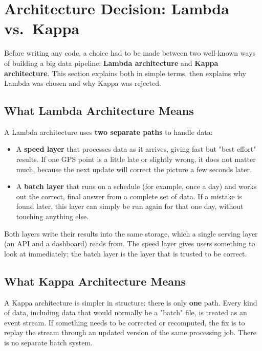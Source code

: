 \documentclass[12pt,a4paper]{article}
\begin{document}
\section{Architecture Decision: Lambda vs.\ Kappa}

Before writing any code, a choice had to be made between two well-known
ways of building a big data pipeline: \textbf{Lambda architecture} and
\textbf{Kappa architecture}. This section explains both in simple terms,
then explains why Lambda was chosen and why Kappa was rejected.

\subsection{What Lambda Architecture Means}

A Lambda architecture uses \textbf{two separate paths} to handle data:

\begin{itemize}
  \item A \textbf{speed layer} that processes data as it arrives, giving
    fast but "best effort" results. If one GPS point is a little late or
    slightly wrong, it does not matter much, because the next update will
    correct the picture a few seconds later.
  \item A \textbf{batch layer} that runs on a schedule (for example, once a
    day) and works out the correct, final answer from a complete set of
    data. If a mistake is found later, this layer can simply be run again
    for that one day, without touching anything else.
\end{itemize}

Both layers write their results into the same storage, which a single
serving layer (an API and a dashboard) reads from. The speed layer gives
users something to look at immediately; the batch layer is the layer that
is trusted to be correct.

\subsection{What Kappa Architecture Means}

A Kappa architecture is simpler in structure: there is only \textbf{one}
path. Every kind of data, including data that would normally be a "batch"
file, is treated as an event stream. If something needs to be corrected or
recomputed, the fix is to replay the stream through an updated version of
the same processing job. There is no separate batch system.
\end{document}
